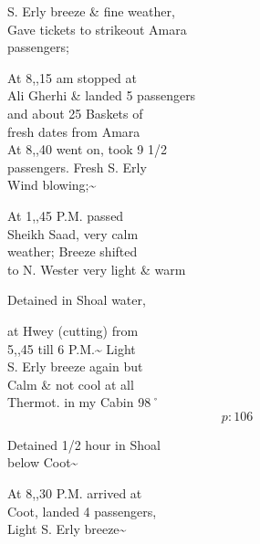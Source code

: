\documentclass{report}
\begin{document}
	\par{
 	S. Erly breeze \& fine weather,\ \\Gave tickets to \lbrack strikeout Amara\ \\passengers;\ \\
	}

	\par{
 	At 8,,15 am stopped at\ \\Ali Gherhi \& landed 5 passengers\ \\and about 25 Baskets of\ \\fresh dates from Amara\ \\At 8,,40 went on, took 9 1/2\ \\passengers. Fresh S. Erly\ \\Wind blowing;\~{}\ \\
	}

	\par{
 	At 1,,45 P.M. passed\ \\Sheikh Saad, very calm\ \\weather; Breeze shifted\ \\to N. Wester very light \& warm\ \\
	}

	\par{
 	Detained in Shoal water,\ \\
	}

	\par{
 	at Hwey (cutting) from\ \\5,,45 till 6 P.M.\~{} Light\ \\S. Erly breeze again but\ \\Calm \& not cool at all\ \\Thermot. in my Cabin 98˚\ \\
  \[p: 106 \]

	}




	\par{
 	Detained 1/2 hour in Shoal\ \\below Coot\~{}\ \\
	}

	\par{
 	At 8,,30 P.M. arrived at\ \\Coot, landed 4 passengers,\ \\Light S. Erly breeze\~{}\ \\
	}
\end{document}
